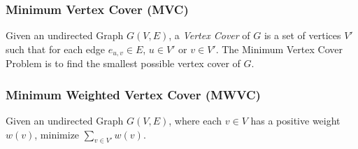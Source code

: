 \subsubsection{Minimum Vertex Cover (MVC)}
\label{sub:mvc}
Given an undirected Graph $G(V,E)$, a {\em Vertex Cover} of $G$ is a set of vertices $V'$ such that for each edge $e_{u,v} \in E$, $u \in V'$ or $v \in V'$. The Minimum Vertex Cover Problem is to find the smallest possible vertex cover of $G$.

\subsubsection{Minimum Weighted Vertex Cover (MWVC)}
\label{sub:mwvc}
Given an undirected Graph $G(V,E)$, where each $v \in V$ has a positive weight $w(v)$, minimize $\sum_{v \in V'} w(v)$.
